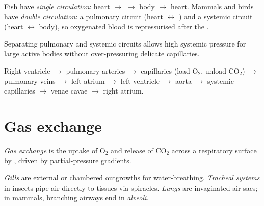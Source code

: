\begin{definition}
\label{def:g12:animal-exchange:double}
Fish have \emph{single circulation}: heart
$\to$  $\to$ body $\to$ heart. Mammals and birds have \emph{double
circulation}: a pulmonary circuit (heart
$\leftrightarrow$ ) and a systemic circuit (heart $\leftrightarrow$
body), so oxygenated blood is repressurised after the .
\end{definition}

\begin{proposition}
\label{prop:g12:animal-exchange:double}
Separating pulmonary and systemic circuits allows high systemic pressure
for large active bodies without over-pressuring delicate 
capillaries.
\end{proposition}
\admitted

\begin{example}
\label{ex:g12:animal-exchange:rbc}
Right ventricle $\to$ pulmonary arteries $\to$  capillaries (load
O$_2$, unload CO$_2$) $\to$ pulmonary veins $\to$ left atrium $\to$ left
ventricle $\to$ aorta $\to$ systemic capillaries $\to$ venae cavae
$\to$ right atrium.
\end{example}

\section{Gas exchange}

\begin{definition}\label{def:g12:animal-exchange:gas}
\emph{Gas exchange} is the uptake of O$_2$ and
release of CO$_2$ across a respiratory surface by , driven by
partial-pressure gradients.
\end{definition}

\begin{definition}
\label{def:g12:animal-exchange:organs}
\emph{Gills} are external or chambered outgrowths for
water-breathing. \emph{Tracheal systems} in
insects pipe air directly to tissues via spiracles. \emph{Lungs}
 are invaginated air sacs; in mammals, branching airways end
in \emph{alveoli}.
\end{definition}

